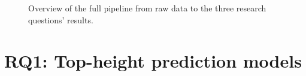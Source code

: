 \documentclass[11pt,a4paper]{report}
\begin{document}
%
%
\begin{figure}[!htbp]
\centering
{}
\caption{Overview of the full pipeline from raw data to the three research questions' results.}
\label{fig:pipeline-overview}
\end{figure}

\section{RQ1: Top-height prediction models}
\end{document}
